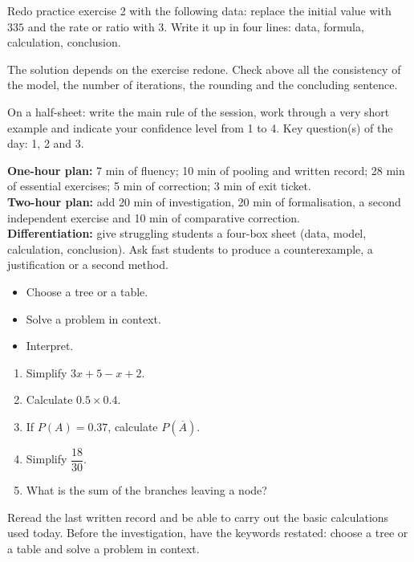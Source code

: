 
    \begin{homework}Redo practice exercise 2 with the following data: replace the initial value with $335$ and the rate or ratio with $3$. Write it up in four lines: data, formula, calculation, conclusion.\end{homework}
    \begin{solution}The solution depends on the exercise redone. Check above all the consistency of the model, the number of iterations, the rounding and the concluding sentence.\end{solution}

    \begin{exitticket}[3 minutes]On a half-sheet: write the main rule of the session, work through a very short example and indicate your confidence level from 1 to 4. Key question(s) of the day: 1, 2 and 3.\end{exitticket}

    \ifmxteacher
    \begin{method}
    \textbf{One-hour plan:} 7 min of fluency; 10 min of pooling and written record; 28 min of essential exercises; 5 min of correction; 3 min of exit ticket.\\
\textbf{Two-hour plan:} add 20 min of investigation, 20 min of formalisation, a second independent exercise and 10 min of comparative correction.\\
\textbf{Differentiation:} give struggling students a four-box sheet (data, model, calculation, conclusion). Ask fast students to produce a counterexample, a justification or a second method.
    \end{method}
    \fi
{}
\begin{objectives}\begin{itemize}\item Choose a tree or a table.\item Solve a problem in context.\item Interpret.\end{itemize}\end{objectives}
\begin{fluency}\begin{enumerate}\item Simplify $3x+5-x+2$. \item Calculate $\num{0,5}\times\num{0,4}$. \item If $P(A)=\num{0,37}$, calculate $P(\overline A)$. \item Simplify $\dfrac{18}{30}$. \item What is the sum of the branches leaving a node? \end{enumerate}\end{fluency}
\begin{prerequisites}Reread the last written record and be able to carry out the basic calculations used today. Before the investigation, have the keywords restated: choose a tree or a table and solve a problem in context.\end{prerequisites}

